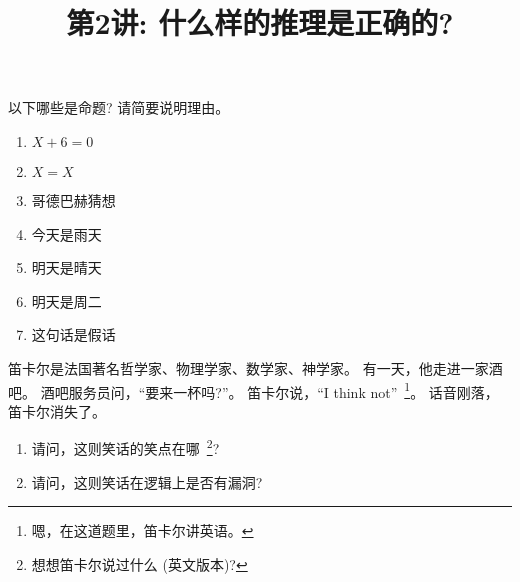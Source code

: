 \documentclass[a4paper, justified]{tufte-handout}
\title{第2讲: 什么样的推理是正确的?}
\date{\zhtoday} %
\begin{document}
\maketitle
\noplagiarism %
\begin{abstract}
  \begin{center}{}
  \end{center}
\end{abstract}
\beginrequired

\begin{problem}
  以下哪些是命题? 请简要说明理由。

  \begin{enumerate}[(1)]
    \item $X + 6 = 0$
    \item $X = X$
    \item 哥德巴赫猜想
    \item 今天是雨天
    \item 明天是晴天
    \item 明天是周二
    \item 这句话是假话
  \end{enumerate}
\end{problem}

\begin{solution}
\end{solution}

\begin{problem}
  笛卡尔是法国著名哲学家、物理学家、数学家、神学家。
  有一天，他走进一家酒吧。
  酒吧服务员问，``要来一杯吗?''。
  笛卡尔说，``I think not''~\footnote{嗯，在这道题里，笛卡尔讲英语。}。
  话音刚落，笛卡尔消失了。

  \begin{enumerate}[(1)]
    \item 请问，这则笑话的笑点在哪~\footnote{想想笛卡尔说过什么 (英文版本)?}?
    \item 请问，这则笑话在逻辑上是否有漏洞?
  \end{enumerate}
\end{problem}
\end{document}
